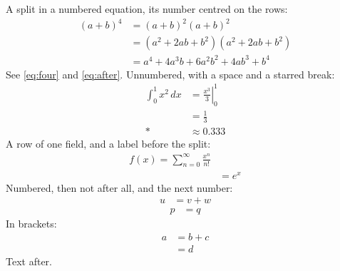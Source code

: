\documentclass{article}
\begin{document}
A split in a numbered equation, its number centred on the rows:
\begin{equation}
\begin{split}
(a+b)^4 &= (a+b)^2 (a+b)^2 \\
        &= (a^2 + 2ab + b^2)(a^2 + 2ab + b^2) \\
        &= a^4 + 4a^3b + 6a^2b^2 + 4ab^3 + b^4
\end{split}
\label{eq:four}
\end{equation}
See \eqref{eq:four} and \eqref{eq:after}. Unnumbered, with a space and a starred break:
\begin{equation*}
\begin{split}
\int_0^1 x^2\,dx &= \left. \frac{x^3}{3} \right|_0^1 \\[4pt]
                 &= \frac{1}{3} \\*
                 &\approx 0.333
\end{split}
\end{equation*}
A row of one field, and a label before the split:
\begin{equation}
\label{eq:after}
\begin{split}
f(x) = \sum_{n=0}^{\infty} \frac{x^n}{n!} \\
     & = e^x
\end{split}
\end{equation}
Numbered, then not after all, and the next number:
\begin{equation}
\begin{split}
u &= v + w
\end{split}
\nonumber
\end{equation}
\begin{equation}
\begin{split}
p &= q
\end{split}
\end{equation}
In brackets:
\[
\begin{split}
a &= b + c \\
  &= d
\end{split}
\]
Text after.
\end{document}
